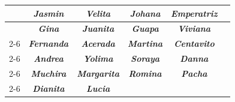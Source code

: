 \begin{table}[H]
{\begin{tabular}{|c|ccccc|}
    \rowcolor[HTML]{C0C0C0}
    \multirow{-4}{*}{\cellcolor[HTML]{000000}{\color[HTML]{FFFFFF} \textit{\textbf{1}}}} &
      \multicolumn{1}{c|}{\cellcolor[HTML]{C0C0C0}\textit{\textbf{Jasmin}}} &
      \multicolumn{1}{c|}{\cellcolor[HTML]{C0C0C0}\textit{\textbf{Velita}}} &
      \multicolumn{1}{c|}{\cellcolor[HTML]{C0C0C0}\textit{\textbf{Johana}}} &
      \multicolumn{1}{c|}{\cellcolor[HTML]{C0C0C0}\textit{\textbf{Emperatriz}}} &
      \textit{\textbf{}} \\ \hline
    \rowcolor[HTML]{A3E1F3}
    \cellcolor[HTML]{1122C6}{\color[HTML]{FFFFFF} } &
      \multicolumn{1}{c|}{\cellcolor[HTML]{A3E1F3}\textit{\textbf{Gina}}} &
      \multicolumn{1}{c|}{\cellcolor[HTML]{A3E1F3}\textit{\textbf{Juanita}}} &
      \multicolumn{1}{c|}{\cellcolor[HTML]{A3E1F3}\textit{\textbf{Guapa}}} &
      \multicolumn{1}{c|}{\cellcolor[HTML]{A3E1F3}\textit{\textbf{Viviana}}} &
      \textit{\textbf{}} \\ \cline{2-6}
    \rowcolor[HTML]{A3E1F3}
    \cellcolor[HTML]{1122C6}{\color[HTML]{FFFFFF} } &
      \multicolumn{1}{c|}{\cellcolor[HTML]{A3E1F3}\textit{\textbf{Fernanda}}} &
      \multicolumn{1}{c|}{\cellcolor[HTML]{A3E1F3}\textit{\textbf{Acerada}}} &
      \multicolumn{1}{c|}{\cellcolor[HTML]{A3E1F3}\textit{\textbf{Martina}}} &
      \multicolumn{1}{c|}{\cellcolor[HTML]{A3E1F3}\textit{\textbf{Centavito}}} &
      \textit{\textbf{}} \\ \cline{2-6}
    \rowcolor[HTML]{A3E1F3}
    \cellcolor[HTML]{1122C6}{\color[HTML]{FFFFFF} } &
      \multicolumn{1}{c|}{\cellcolor[HTML]{A3E1F3}\textit{\textbf{Andrea}}} &
      \multicolumn{1}{c|}{\cellcolor[HTML]{A3E1F3}\textit{\textbf{Yolima}}} &
      \multicolumn{1}{c|}{\cellcolor[HTML]{A3E1F3}\textit{\textbf{Soraya}}} &
      \multicolumn{1}{c|}{\cellcolor[HTML]{A3E1F3}\textit{\textbf{Danna}}} &
      \textit{\textbf{}} \\ \cline{2-6}
    \rowcolor[HTML]{A3E1F3}
    \cellcolor[HTML]{1122C6}{\color[HTML]{FFFFFF} } &
      \multicolumn{1}{c|}{\cellcolor[HTML]{A3E1F3}\textit{\textbf{Muchira}}} &
      \multicolumn{1}{c|}{\cellcolor[HTML]{A3E1F3}\textit{\textbf{Margarita}}} &
      \multicolumn{1}{c|}{\cellcolor[HTML]{A3E1F3}\textit{\textbf{Romina}}} &
      \multicolumn{1}{c|}{\cellcolor[HTML]{A3E1F3}\textit{\textbf{Pacha}}} &
      \textit{\textbf{}} \\ \cline{2-6}
    \rowcolor[HTML]{A3E1F3}
    \cellcolor[HTML]{1122C6}{\color[HTML]{FFFFFF} } &
      \multicolumn{1}{c|}{\cellcolor[HTML]{A3E1F3}\textit{\textbf{Dianita}}} &
      \multicolumn{1}{c|}{\cellcolor[HTML]{A3E1F3}\textit{\textbf{Lucia}}} &

\end{tabular}}
\end{table}
